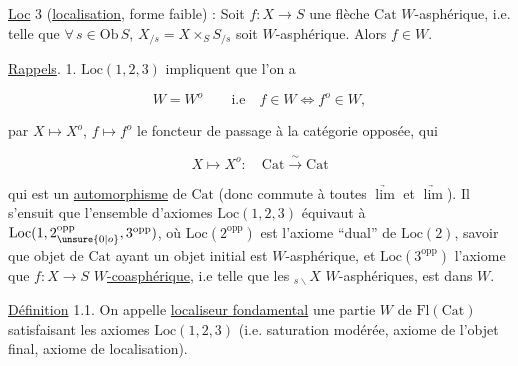 
\uline{Loc} 3 (\uline{localisation}, forme faible) : Soit $f:X\longrightarrow S$ une
flèche  $\mathrm{Cat}$ $W$-asphérique, i.e. telle que
$\forall\,s\in\mathrm{Ob}\,S$,  $X_{/s}=X\times_S S_{/s}$ soit $W$-asphérique. Alors $f\in W$.


\uline{Rappels}. 1. $\mathrm{Loc}(1,2,3)$ impliquent que l'on a

\[
W=W^o\qquad\text{i.e}\quad f\in W\iff f^o\in W,
\]

 par $X\longmapsto X^o$, $f\longmapsto f^o$ le
foncteur de passage à la catégorie opposée,  qui

\[
X\longmapsto X^o:\quad \mathrm{Cat}\xrightarrow{\sim}\mathrm{Cat}
\]

qui est un \uline{automorphisme} de $\mathrm{Cat}$ (donc
commute à toutes $\underrightarrow{\lim}$ et $\underrightarrow{\lim}$). Il
s'ensuit que l'ensemble d'axiomes
$\mathrm{Loc}(1,2,3)$ équivaut à $\mathrm{Loc}(1,2_{\unsure{0|o}}^{\mathrm{opp}},3^{\mathrm{opp}})$, où
$\mathrm{Loc}(2^{\mathrm{opp}})$ est l'axiome ``dual'' de $\mathrm{Loc}(2)$,
savoir que  objet de $\mathrm{Cat}$ ayant
un objet initial est $W$-asphérique, et
$\mathrm{Loc}(3^{\mathrm{opp}})$ l'axiome que  $f:X\to S$ \uline{$W$-coasphérique}, i.e telle que les 
$ {}_{s\backslash}X$    $W$-asphériques, est dans $W$.

 
\uline{Définition} 1.1. On appelle \uline{localiseur fondamental}
une partie $W$ de $\mathrm{Fl}(\mathrm{Cat})$ satisfaisant les
axiomes $\mathrm{Loc}(1,2,3)$ (i.e. saturation modérée,
axiome de l'objet final, axiome de localisation).
